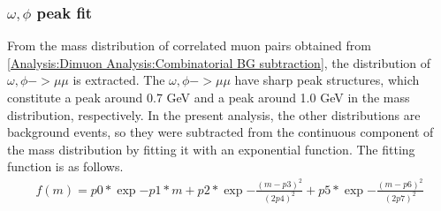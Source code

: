         \subsubsection{$\omega,\phi$ peak fit}
            From the mass distribution of correlated muon pairs obtained from \ref{Analysis:Dimuon Analysis:Combinatorial BG subtraction}, the distribution of $\omega,\phi->\mu\mu$ is extracted. The $\omega,\phi->\mu\mu$ have sharp peak structures, which constitute a peak around 0.7 GeV and a peak around 1.0 GeV in the mass distribution, respectively. In the present analysis, the other distributions are background events, so they were subtracted from the continuous component of the mass distribution by fitting it with an exponential function. The fitting function is as follows.
            \begin{eqnarray}
                f(m)=p0*\exp{-p1* m}+p2*\exp{-\frac{(m-p3)^2}{(2p4)^2}}+p5*\exp{-\frac{(m-p6)^2}{(2p7)^2}}
            \end{eqnarray}

